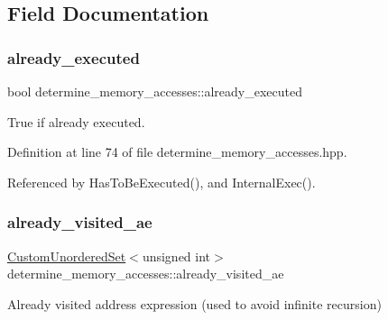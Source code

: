 \subsection{Field Documentation}
\mbox{\label{classdetermine__memory__accesses_a0f7480b9ae00c5876ac48e7d073b2c05}} 
\subsubsection{\texorpdfstring{already\+\_\+executed}{already\_executed}}
{\footnotesize\ttfamily bool determine\+\_\+memory\+\_\+accesses\+::already\+\_\+executed\hspace{0.3cm}{\ttfamily [private]}}



True if already executed. 



Definition at line 74 of file determine\+\_\+memory\+\_\+accesses.\+hpp.



Referenced by Has\+To\+Be\+Executed(), and Internal\+Exec().

\mbox{\label{classdetermine__memory__accesses_a521b58bdb10fe63f37a04982c526096b}} 
\subsubsection{\texorpdfstring{already\+\_\+visited\+\_\+ae}{already\_visited\_ae}}
{\footnotesize\ttfamily \hyperlink{classCustomUnorderedSet}{Custom\+Unordered\+Set}$<$unsigned int$>$ determine\+\_\+memory\+\_\+accesses\+::already\+\_\+visited\+\_\+ae\hspace{0.3cm}{\ttfamily [private]}}



Already visited address expression (used to avoid infinite recursion) 



